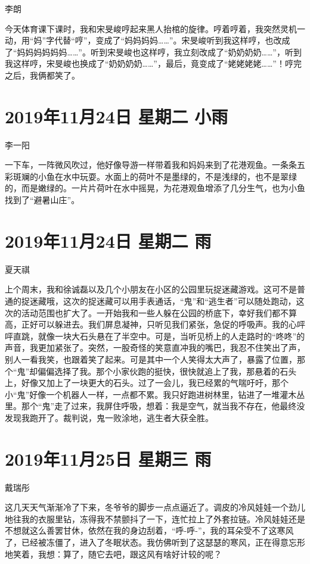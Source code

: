 李朗

今天体育课下课时，我和宋旻峻哼起来黑人抬棺的旋律。哼着哼着，我突然灵机一动，用``妈''字代替``哼''，变成了``妈妈妈妈\ldots\ldots{}''。宋旻峻听到我这样哼，也改成了``妈妈妈妈妈妈\ldots\ldots{}''。听到宋旻峻也这样哼，我立刻改成了``奶奶奶奶\ldots\ldots{}''，听到我这样哼，宋旻峻也换成了``奶奶奶奶\ldots\ldots{}''，最后，竟变成了``姥姥姥姥\ldots\ldots{}''！哼完之后，我俩都笑了。

\section{2019年11月24日 星期二 小雨}

李一阳

一下车，一阵微风吹过，他好像导游一样带着我和妈妈来到了花港观鱼。一条条五彩斑斓的小鱼在水中玩耍。水面上的荷叶不是墨绿的，不是浅绿的，也不是翠绿的，而是嫩绿的。一片片荷叶在水中摇晃，为花港观鱼增添了几分生气，也为小鱼找到了``避暑山庄''。

\section{2019年11月24日 星期二 雨}

夏天祺

上个周末，我和徐诚磊以及几个小朋友在小区的公园里玩捉迷藏游戏。这可不是普通的捉迷藏哦，这次的捉迷藏可以用手表通话，``鬼''和``逃生者''可以随处跑动，这次的活动范围也扩大了。一开始我和一些人躲在公园的桥底下，幸好我们都不算高，正好可以躲进去。我们屏息凝神，只听见我们紧张，急促的呼吸声。我的心呯呯直跳，就像一块大石头悬在了半空中。可是，当听见桥上的人走路时的``咚咚''的声音，我更加紧张了。突然，一股奇怪的笑意直冲我的嘴巴，我忍不住笑出了声，别人一看我笑，也跟着笑了起来。可是其中一个人笑得太大声了，暴露了位置，那个``鬼''却偏偏选择了我。那个小家伙跑的挺快，很快就追上了我，那悬着的石头上，好像又加上了一块更大的石头。过了一会儿，我已经累的气喘吁吁，那个小``鬼''好像一个机器人一样，一点都不累。我只好跑进树林里，钻进了一堆灌木丛里。那个``鬼''走了过来，我屏住呼吸，想着：我是空气，就当我不存在，他最终没发现我跑开了。裁判说，鬼一败涂地，逃生者大获全胜。

\section{2019年11月25日 星期三 雨}

戴瑞彤

这几天天气渐渐冷了下来，冬爷爷的脚步一点点逼近了。调皮的冷风娃娃一个劲儿地往我的衣服里钻，冻得我不禁颤抖了一下，连忙拉上了外套拉链。冷风娃娃还是不想就这么善罢甘休，依然在我的身边刮着，``呼-呼-''，我的耳朵受不了这寒风了，已经被冻僵了，进入了冬眠状态。我仿佛听到了这瑟瑟的寒风，正在得意忘形地笑着，我想：算了，随它去吧，跟这风有啥好计较的呢？

